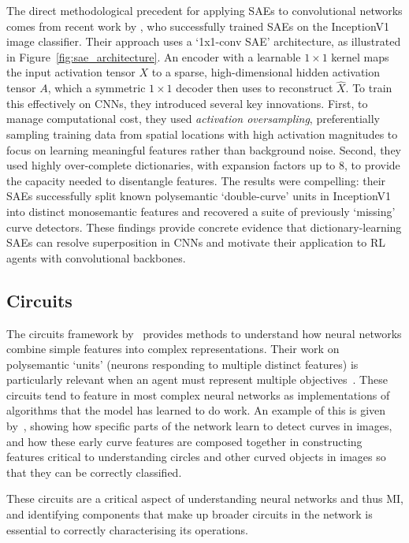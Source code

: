 The direct methodological precedent for applying SAEs to convolutional networks comes from recent work by \citet{gorton_2024_missing}, who successfully trained SAEs on the InceptionV1 image classifier. Their approach uses a `1x1-conv SAE' architecture, as illustrated in Figure~\ref{fig:sae_architecture}. An encoder with a learnable $1\times1$ kernel maps the input activation tensor $X$ to a sparse, high-dimensional hidden activation tensor $A$, which a symmetric $1\times1$ decoder then uses to reconstruct $\hat{X}$. To train this effectively on CNNs, they introduced several key innovations. First, to manage computational cost, they used \emph{activation oversampling}, preferentially sampling training data from spatial locations with high activation magnitudes to focus on learning meaningful features rather than background noise. Second, they used highly over-complete dictionaries, with expansion factors up to 8, to provide the capacity needed to disentangle features. The results were compelling: their SAEs successfully split known polysemantic `double-curve' units in InceptionV1 into distinct monosemantic features and recovered a suite of previously `missing' curve detectors. These findings provide concrete evidence that dictionary-learning SAEs can resolve superposition in CNNs and motivate their application to RL agents with convolutional backbones.

\subsection{Circuits}
The circuits framework by~\citet{olah_2020_zoom} provides methods to understand how neural networks combine simple features into complex representations. Their work on polysemantic `units' (neurons responding to multiple distinct features) is particularly relevant when an agent must represent multiple objectives~\citep{elhage2022superposition}. These circuits tend to feature in most complex neural networks as implementations of algorithms that the model has learned to do work. An example of this is given by~\citet{cammarata2020curve}, showing how specific parts of the network learn to detect curves in images, and how these early curve features are composed together in constructing features critical to understanding circles and other curved objects in images so that they can be correctly classified.

These circuits are a critical aspect of understanding neural networks and thus MI, and identifying components that make up broader circuits in the network is essential to correctly characterising its operations.


